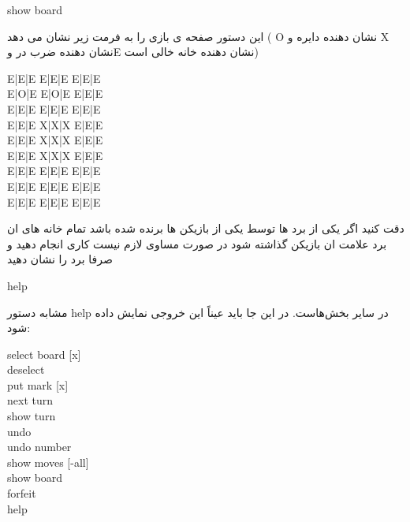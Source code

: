 \documentclass[]{article}
\begin{document}
\hrulefill


\begin{tcolorbox}[boxrule=0pt]
	\begin{latin}
  	  \large{
  	  	show board
		}
	\end{latin}
\end{tcolorbox}

این دستور صفحه ی بازی را به فرمت زیر نشان می دهد ( O نشان دهنده دایره و X نشان دهنده ضرب در وE نشان دهنده خانه خالی است)

\begin{tcolorbox}[boxrule=0pt]
	\begin{latin}
  	  \large{
  	  	E|E|E E|E|E E|E|E  \\
  	  	E|O|E E|O|E E|E|E  \\
  	  	E|E|E E|E|E E|E|E  \\
  	  	E|E|E X|X|X E|E|E  \\
  	  	E|E|E X|X|X E|E|E  \\
  	  	E|E|E X|X|X E|E|E  \\
  	  	E|E|E E|E|E E|E|E  \\
  	  	E|E|E E|E|E E|E|E  \\
  	  	E|E|E E|E|E E|E|E  
		}
	\end{latin}
\end{tcolorbox}
دقت کنید اگر یکی از برد ها توسط یکی از بازیکن ها برنده شده باشد تمام خانه های ان برد علامت ان بازیکن گذاشته شود در صورت مساوی لازم نیست کاری انجام دهید و صرفا برد را نشان دهید

\hrulefill


\begin{tcolorbox}[boxrule=0pt]
	\begin{latin}
  	  \large{
  	  	help
		}
	\end{latin}
\end{tcolorbox}

مشابه دستور help در سایر بخش‌هاست. در این جا باید عیناً این خروجی نمایش داده شود:



\begin{tcolorbox}[boxrule=0pt]
	\begin{latin}
  	  \large{
select board [x]\\
deselect\\
put mark [x]\\
next turn\\
show turn\\
undo\\
undo number\\
show moves [-all]\\
show board\\
forfeit\\
help

		}
	\end{latin}
\end{tcolorbox}
\end{document}
